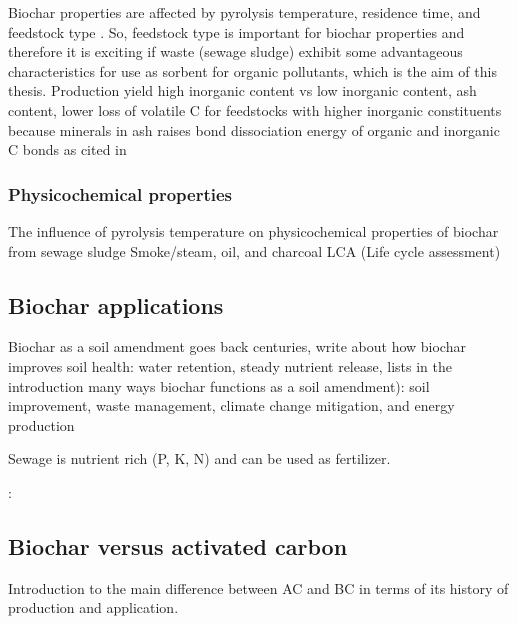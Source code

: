 Biochar properties are affected by pyrolysis temperature, residence time, and feedstock type \citep{Ahmad2014}. So, feedstock type is important for biochar properties and therefore it is exciting if waste (sewage sludge) exhibit some advantageous characteristics for use as sorbent for organic pollutants, which is the aim of this thesis. 
\citep{Li2019}
Production yield high inorganic content vs low inorganic content, ash content, lower loss of volatile C for feedstocks with higher inorganic constituents because minerals in ash raises bond dissociation energy of organic and inorganic C bonds \citep{Cantrell2012,Enders2012} as cited in \citep{Ahmad2014}

\subsubsection{Physicochemical properties}
The influence of pyrolysis temperature on physicochemical properties of biochar from sewage sludge \citep{Figueiredo2018}
Smoke/steam, oil, and charcoal
LCA (Life cycle assessment)

\subsection{Biochar applications}
Biochar as a soil amendment goes back centuries, write about how biochar improves soil health: water retention, steady nutrient release,  \citep{Ahmad2014} lists in the introduction many ways biochar functions as a soil amendment): soil improvement, waste management, climate change mitigation, and energy production

Sewage is nutrient rich (P, K, N) and can be used as fertilizer.

\citep{Ahmad2014}:

\subsection{Biochar versus activated carbon}\label{sec:BCvsAC}
Introduction to the main difference between AC and BC in terms of its history of production and application. 

